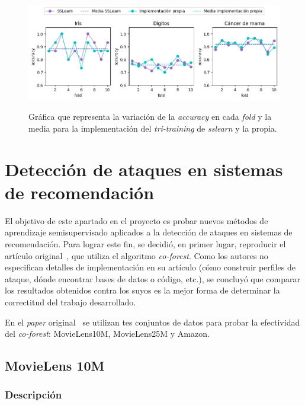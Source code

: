 \begin{figure}[h]
	\caption[\textit{Tri-training}: comparativa contra \textit{sslearn}]{Gráfica que representa la variación de la \textit{accuracy} en cada \textit{fold} y la media para la implementación del \textit{tri-training} de \textit{sslearn} y la propia.}
	\centering
	\includegraphics[scale=0.62]{../img/memoria/5_tritraining_sslearn}
	\label{gr:tt_vs_sslearn}
\end{figure}


\section{Detección de ataques en sistemas de recomendación}

El objetivo de este apartado en el proyecto es probar nuevos métodos de aprendizaje semisupervisado aplicados a la detección de ataques en sistemas de recomendación. Para lograr este fin, se decidió, en primer lugar, reproducir el artículo original~\cite{zhou2021SemisupervisedRecommendationAttack}, que utiliza el algoritmo \textit{co-forest}. Como los autores no especifican detalles de implementación en su artículo (cómo construir perfiles de ataque, dónde encontrar bases de datos o código, etc.), se concluyó que comparar los resultados obtenidos contra los suyos es la mejor forma de determinar la correctitud del trabajo desarrollado.

En el \textit{paper} original~\cite{zhou2021SemisupervisedRecommendationAttack} se utilizan tes conjuntos de datos para probar la efectividad del \textit{co-forest}: MovieLens10M, MovieLens25M y Amazon.

\subsection{MovieLens 10M}
\subsubsection{Descripción}

